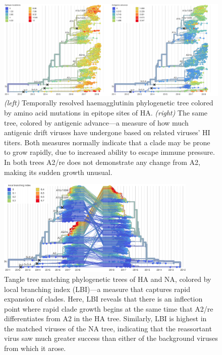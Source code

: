 \begin{figure}[h]
    \begin{center}
    \includegraphics[width=\textwidth]{figures/epi_aa_trees_high_res.png}
    \end{center}
    \caption{\textit{(left)} Temporally resolved haemagglutinin phylogenetic tree colored by amino acid mutations in epitope sites \cite{Wolf2006} of HA. \textit{(right)} The same tree, colored by antigenic advance---a measure of how much antigenic drift viruses have undergone based on related viruses' HI titers. Both measures normally indicate that a clade may be prone to grow rapidly, due to increased ability to escape immune pressure. In both trees A2/re does not demonstrate any change from A2, making its sudden growth unusual.}
    \label{sup_fig:epitope_aa}
\end{figure}

\begin{figure}[h]
    \begin{center}
    \includegraphics[width=0.85\textwidth]{figures/ha_na_lbi_high_res.png}
    \end{center}
    \caption{Tangle tree matching phylogenetic trees of HA and NA, colored by local branching index (LBI)---a measure that captures rapid expansion of clades. Here, LBI reveals that there is an inflection point where rapid clade growth begins at the same time that A2/re differentiates from A2 in the HA tree. Similarly, LBI is highest in the matched viruses of the NA tree, indicating that the reassortant virus saw much greater success than either of the background viruses from which it arose.}
    \label{sup_fig:lbi}
\end{figure}

